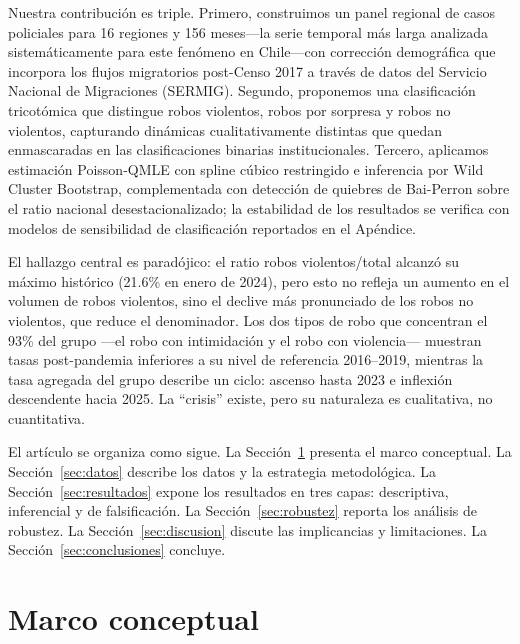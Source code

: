 \documentclass[12pt,a4paper]{article}
\begin{document}
Nuestra contribuci\'on es triple. Primero, construimos un panel regional de casos
policiales para 16 regiones y 156 meses---la serie temporal m\'as larga analizada
sistem\'aticamente para este fen\'omeno en Chile---con correcci\'on demogr\'afica que
incorpora los flujos migratorios post-Censo 2017 a trav\'es de datos del Servicio
Nacional de Migraciones (SERMIG). Segundo, proponemos una clasificaci\'on tricot\'omica
que distingue robos violentos, robos por sorpresa y robos no violentos, capturando
din\'amicas cualitativamente distintas que quedan enmascaradas en las clasificaciones
binarias institucionales. Tercero, aplicamos estimaci\'on Poisson-QMLE con spline c\'ubico restringido e inferencia por Wild Cluster Bootstrap, complementada con detecci\'on de quiebres de Bai-Perron sobre el ratio nacional desestacionalizado; la estabilidad de los resultados se verifica con modelos de sensibilidad de clasificaci\'on reportados en el Ap\'endice.

El hallazgo central es parad\'ojico: el ratio robos violentos/total alcanz\'o su
m\'aximo hist\'orico (21.6\% en enero de 2024), pero esto no refleja un aumento en
el volumen de robos violentos, sino el declive m\'as pronunciado de los robos no
violentos, que reduce el denominador. Los dos tipos de robo que concentran el 93\% del grupo ---el robo con intimidaci\'on y el robo con violencia--- muestran tasas post-pandemia inferiores a su nivel de referencia 2016--2019, mientras la tasa agregada del grupo describe un ciclo: ascenso hasta 2023 e inflexi\'on descendente hacia 2025. La ``crisis'' existe, pero su naturaleza es cualitativa, no cuantitativa.

El art\'iculo se organiza como sigue. La Secci\'on~\ref{sec:marco} presenta el marco
conceptual. La Secci\'on~\ref{sec:datos} describe los datos y la estrategia
metodol\'ogica. La Secci\'on~\ref{sec:resultados} expone los resultados en tres capas:
descriptiva, inferencial y de falsificaci\'on. La Secci\'on~\ref{sec:robustez} reporta
los an\'alisis de robustez. La Secci\'on~\ref{sec:discusion} discute las implicancias
y limitaciones. La Secci\'on~\ref{sec:conclusiones} concluye.


\section{Marco conceptual}
\label{sec:marco}
\end{document}

